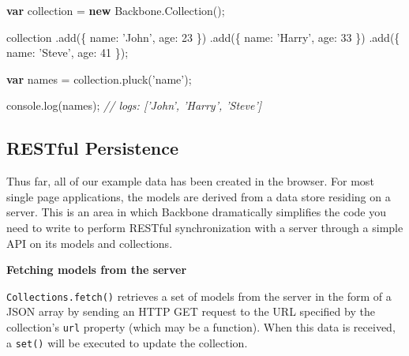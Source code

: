 \documentclass[9pt]{book}
\newenvironment{Shaded}{}{}
\newcommand{\KeywordTok}[1]{\textcolor[rgb]{0.00,0.44,0.13}{\textbf{{#1}}}}
\newcommand{\DataTypeTok}[1]{\textcolor[rgb]{0.56,0.13,0.00}{{#1}}}
\newcommand{\DecValTok}[1]{\textcolor[rgb]{0.25,0.63,0.44}{{#1}}}
\newcommand{\StringTok}[1]{\textcolor[rgb]{0.25,0.44,0.63}{{#1}}}
\newcommand{\CommentTok}[1]{\textcolor[rgb]{0.38,0.63,0.69}{\textit{{#1}}}}
\newcommand{\OtherTok}[1]{\textcolor[rgb]{0.00,0.44,0.13}{{#1}}}
\newcommand{\FunctionTok}[1]{\textcolor[rgb]{0.02,0.16,0.49}{{#1}}}
\newcommand{\NormalTok}[1]{{#1}}
\begin{document}
\begin{Shaded}
\begin{Highlighting}[]
\KeywordTok{var} \NormalTok{collection = }\KeywordTok{new} \OtherTok{Backbone}\NormalTok{.}\FunctionTok{Collection}\NormalTok{();}

\NormalTok{collection}
    \NormalTok{.}\FunctionTok{add}\NormalTok{(\{ }\DataTypeTok{name}\NormalTok{: }\StringTok{'John'}\NormalTok{, }\DataTypeTok{age}\NormalTok{: }\DecValTok{23} \NormalTok{\})}
    \NormalTok{.}\FunctionTok{add}\NormalTok{(\{ }\DataTypeTok{name}\NormalTok{: }\StringTok{'Harry'}\NormalTok{, }\DataTypeTok{age}\NormalTok{: }\DecValTok{33} \NormalTok{\})}
    \NormalTok{.}\FunctionTok{add}\NormalTok{(\{ }\DataTypeTok{name}\NormalTok{: }\StringTok{'Steve'}\NormalTok{, }\DataTypeTok{age}\NormalTok{: }\DecValTok{41} \NormalTok{\});}

\KeywordTok{var} \NormalTok{names = }\OtherTok{collection}\NormalTok{.}\FunctionTok{pluck}\NormalTok{(}\StringTok{'name'}\NormalTok{);}

\OtherTok{console}\NormalTok{.}\FunctionTok{log}\NormalTok{(names); }\CommentTok{// logs: ['John', 'Harry', 'Steve']}
\end{Highlighting}
\end{Shaded}

\subsection{RESTful Persistence}\label{restful-persistence}

Thus far, all of our example data has been created in the browser. For
most single page applications, the models are derived from a data store
residing on a server. This is an area in which Backbone dramatically
simplifies the code you need to write to perform RESTful synchronization
with a server through a simple API on its models and collections.

\textbf{Fetching models from the server}

\texttt{Collections.fetch()} retrieves a set of models from the server
in the form of a JSON array by sending an HTTP GET request to the URL
specified by the collection's \texttt{url} property (which may be a
function). When this data is received, a \texttt{set()} will be executed
to update the collection.
\end{document}
